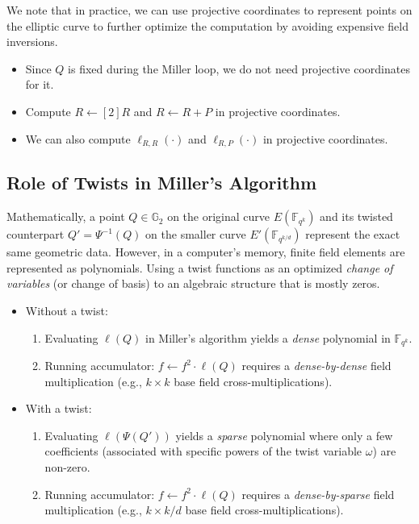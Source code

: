 We note that in practice, we can use projective coordinates to represent points on the elliptic curve to further optimize the computation by avoiding expensive field inversions.
\begin{itemize}
	\item Since $Q$ is fixed during the Miller loop, we do not need projective coordinates for it.
	\item Compute $R \gets [2]R$ and $R \gets R+P$ in projective coordinates.
	\item We can also compute $\ell_{R,R}(\cdot)$ and $\ell_{R,P}(\cdot)$ in projective coordinates.
\end{itemize}

\subsection{Role of Twists in Miller's Algorithm}

Mathematically, a point $Q \in \mathbb{G}_2$ on the original curve $E(\mathbb{F}_{q^k})$ and its twisted counterpart $Q' =\Psi^{-1}(Q)$ on the smaller curve $E'(\mathbb{F}_{q^{k/d}})$ represent the exact same geometric data. However, in a computer's memory, finite field elements are represented as polynomials. Using a twist functions as an optimized \emph{change of variables} (or change of basis) to an algebraic structure that is mostly zeros.

\begin{itemize}
	\item Without a twist:
		\begin{enumerate}
			\item Evaluating $\ell(Q)$ in Miller's algorithm yields a \emph{dense} polynomial in $\mathbb{F}_{q^k}$. 
			\item Running accumulator: $f \leftarrow f^2 \cdot \ell(Q)$ requires a \emph{dense-by-dense} field multiplication (e.g., $k\times k$ base field cross-multiplications).
		\end{enumerate}
	\item With a twist:
		\begin{enumerate}
			\item Evaluating $\ell(\Psi(Q'))$ yields a \emph{sparse} polynomial where only a few coefficients (associated with specific powers of the twist variable $\omega$) are non-zero.
			\item Running accumulator: $f \leftarrow f^2 \cdot \ell(Q)$ requires a \emph{dense-by-sparse} field multiplication (e.g., $k\times k/d$ base field cross-multiplications).
		\end{enumerate}
\end{itemize}
\pagebreak

\nocite{*}
\printbibliography


